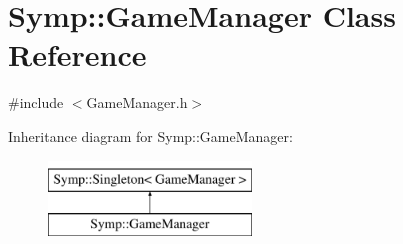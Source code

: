\hypertarget{class_symp_1_1_game_manager}{\section{Symp\-:\-:Game\-Manager Class Reference}
\label{class_symp_1_1_game_manager}
}


{\ttfamily \#include $<$Game\-Manager.\-h$>$}

Inheritance diagram for Symp\-:\-:Game\-Manager\-:\begin{figure}[H]
\begin{center}
\leavevmode
\includegraphics[height=2.000000cm]{class_symp_1_1_game_manager}
\end{center}
\end{figure}
